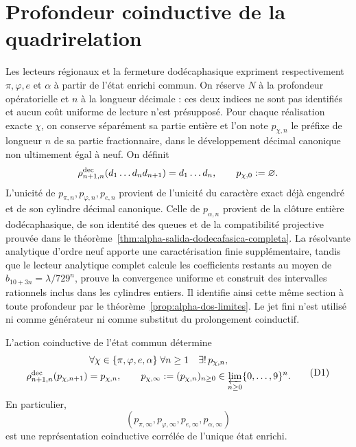 \section{Profondeur coinductive de la quadrirelation}
\label{sec:profundidad-cuatrirrelacion-ch}

Les lecteurs régionaux et la fermeture dodécaphasique expriment respectivement \(\pi,\varphi,e\) et \(\alpha\) à partir de l'état enrichi commun. On réserve \(N\) à la profondeur opératorielle et \(n\) à la longueur décimale : ces deux indices ne sont pas identifiés et aucun coût uniforme de lecture n'est présupposé. Pour chaque réalisation exacte \(\chi\), on conserve séparément sa partie entière et l'on note \(p_{\chi,n}\) le préfixe de longueur \(n\) de sa partie fractionnaire, dans le développement décimal canonique non ultimement égal à neuf. On définit
\[
 \rho^{\rm dec}_{n+1,n}(d_1\ldots d_nd_{n+1})=d_1\ldots d_n,
 \qquad p_{\chi,0}:=\varnothing.
\]
L’unicité de \(p_{\pi,n},p_{\varphi,n},p_{e,n}\) provient de l’unicité du
caractère exact déjà engendré et de son cylindre décimal canonique. Celle de
\(p_{\alpha,n}\) provient de la clôture entière dodécaphasique, de son identité
des queues et de la compatibilité projective prouvée dans le
théorème~\ref{thm:alpha-salida-dodecafasica-completa}. La résolvante analytique
d’ordre neuf apporte une caractérisation finie supplémentaire, tandis que le
lecteur analytique complet calcule les coefficients restants au moyen de
\(b_{10+3n}=\lambda/729^n\), prouve la convergence uniforme et construit
des intervalles rationnels inclus dans les cylindres entiers. Il identifie ainsi
cette même section à toute profondeur par le
théorème~\ref{prop:alpha-dos-limites}. Le jet fini n’est utilisé ni comme
générateur ni comme substitut du prolongement coinductif.

\begin{theorem}
\label{thm:profundidad-cuatrirrelacion-ch}
L’action coinductive de l’état commun détermine
\[
 \begin{gathered}
  \forall\chi\in\{\pi,\varphi,e,\alpha\}\;
  \forall n\ge1\quad\exists!\,p_{\chi,n},\\
  \rho^{\rm dec}_{n+1,n}(p_{\chi,n+1})=p_{\chi,n},
  \qquad
  p_{\chi,\infty}:=(p_{\chi,n})_{n\ge0}
  \in\varprojlim_{n\ge0}\{0,\ldots,9\}^{n}.
 \end{gathered}
\tag{D1}
\label{eq:profundidad-cuatrirrelacion-ch}
\]
En particulier,
\[
 (p_{\pi,\infty},p_{\varphi,\infty},p_{e,\infty},p_{\alpha,\infty})
\tag{D2}
\label{eq:cuatrirrelacion-infinita-ch}
\]
est une représentation coinductive corrélée de l'unique état enrichi.
\end{theorem}

